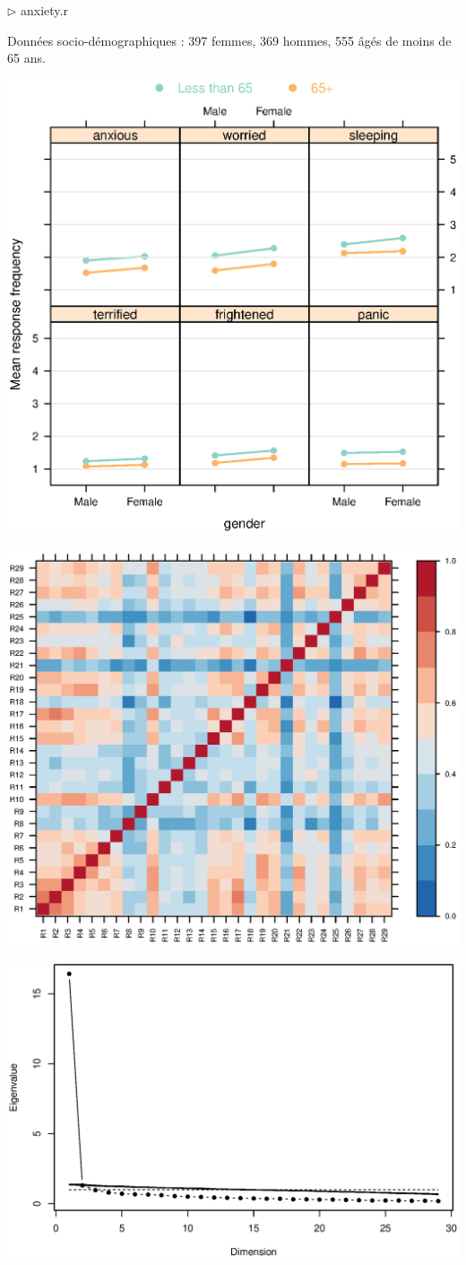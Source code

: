 \hfill $\triangleright$ anxiety.r

Données socio-démographiques : 397 femmes, 369 hommes, 555 âgés de moins de 65
ans.

{\centering \includegraphics[width=.35\textwidth]{figs/anxiety_respfreq_by_gender.eps}\par}



{\centering \includegraphics[width=.5\textwidth]{figs/anxiety_polychoric.eps}\par}



{\centering \includegraphics[width=.5\textwidth]{figs/anxiety_screeplot.eps}\par}

